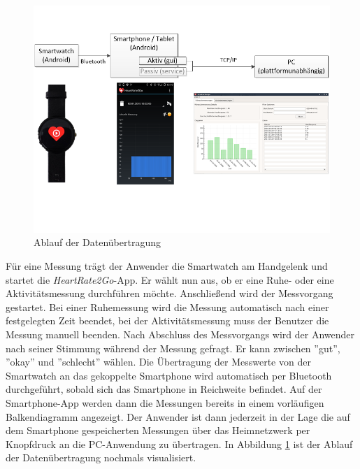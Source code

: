 \begin{figure} [H]
	\centering
		\includegraphics[scale=0.68]{images/ablauf.png}
		\caption{Ablauf der Datenübertragung}
		\label{fig:ablauf}
\end{figure}

Für eine Messung trägt der Anwender die Smartwatch am Handgelenk und startet die \textit{HeartRate2Go}-App. Er wählt nun aus, ob er eine Ruhe- oder eine Aktivitätsmessung durchführen möchte. Anschließend wird der Messvorgang gestartet. Bei einer Ruhemessung wird die Messung automatisch nach einer festgelegten Zeit beendet, bei der Aktivitätsmessung muss der Benutzer die Messung manuell beenden. 
Nach Abschluss des Messvorgangs wird der Anwender nach seiner Stimmung während der Messung gefragt. Er kann zwischen ''gut'', ''okay'' und ''schlecht'' wählen. Die Übertragung der Messwerte von der Smartwatch an das gekoppelte Smartphone wird automatisch per Bluetooth durchgeführt, sobald sich das Smartphone in Reichweite befindet. Auf der Smartphone-App werden dann die Messungen bereits in einem vorläufigen Balkendiagramm angezeigt. Der Anwender ist dann jederzeit in der Lage die auf dem Smartphone gespeicherten Messungen über das Heimnetzwerk per Knopfdruck an die PC-Anwendung zu übertragen. In Abbildung \ref{fig:ablauf} ist der Ablauf der Datenübertragung nochmals visualisiert.

